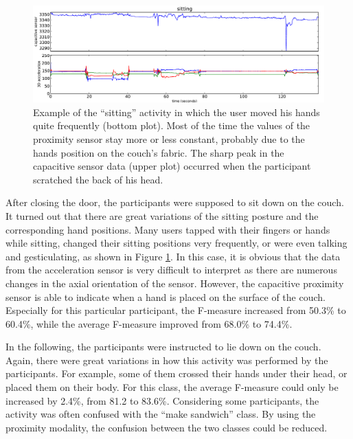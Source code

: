 \documentclass[runningheads,a4paper]{llncs}
\begin{document}
\begin{figure}[h]
	\centering
		\includegraphics[width=1.00\textwidth]{../Auswertung/images/eugen_2.pdf}
	\caption{Example of the ``sitting'' activity in which the user moved his hands quite frequently (bottom plot). Most of the time the values of the proximity sensor stay more or less constant, probably due to the hands position on the couch's fabric. The sharp peak in the capacitive sensor data (upper plot) occurred when the participant scratched the back of his head. }
	\label{fig:sitting}
\end{figure}

After closing the door, the participants were supposed to sit down on the couch. It turned out that there are great variations of the sitting posture and the corresponding hand positions. Many users tapped with their fingers or hands while sitting, changed their sitting positions very frequently, or were even talking and gesticulating, as shown in Figure \ref{fig:sitting}. In this case, it is obvious that the data from the acceleration sensor is very difficult to interpret as there are numerous changes in the axial orientation of the sensor. However, the capacitive proximity sensor is able to indicate when a hand is placed on the surface of the couch. Especially for this particular participant, the F-measure increased from 50.3\% to 60.4\%, while the average F-measure improved from 68.0\% to 74.4\%. 

In the following, the participants were instructed to lie  down on the couch. Again, there were great variations in how this activity was performed by the participants. For example, some of them crossed their hands under their head, or placed them on their body. For this class, the average F-measure could only be increased by 2.4\%, from 81.2 to 83.6\%. Considering some participants, the activity was often confused with the ``make sandwich'' class. By using the proximity modality, the confusion between the two classes could be reduced.
\end{document}
